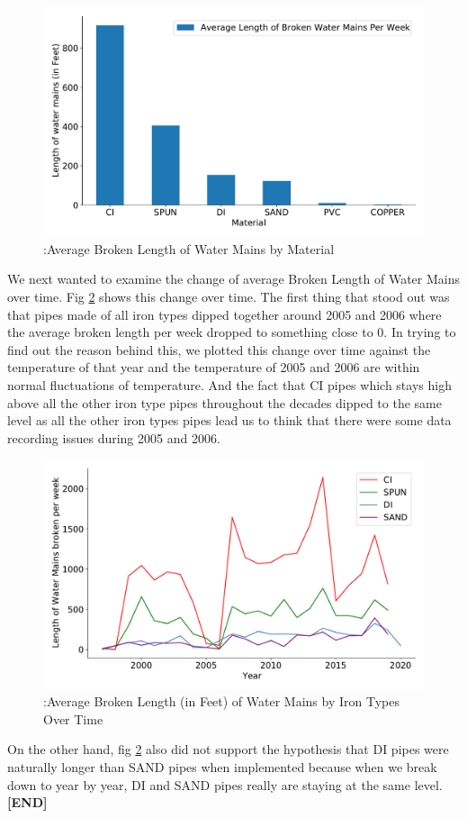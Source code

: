\documentclass[twocolumn]{article}
\begin{document}
\begin{figure}[H]
    \includegraphics[width=\columnwidth]{Wen/Average Length of Broken Water Mains Per Week.pdf}
    \caption{:Average Broken Length of Water Mains by Material}
    \label{fig:Average Broken Length of Water Mains by Material}
\end{figure}
We next wanted to examine the change of average Broken Length of Water Mains over time. Fig \ref{fig:Average Broken Length of Water Mains by Iron Types over time} shows this change over time. The first thing that stood out was that pipes made of all iron types dipped together around 2005 and 2006 where the average broken length per week dropped to something close to 0. In trying to find out the reason behind this, we plotted this change over time against the temperature of that year and the temperature of 2005 and 2006 are within normal fluctuations of temperature. And the fact that CI pipes which stays high above all the other iron type pipes throughout the decades dipped to the same level as all the other iron types pipes lead us to think that there were some data recording issues during 2005 and 2006. 
\begin{figure}[H]
    \includegraphics[width=\columnwidth]{Wen/ave broken len per week.pdf}
    \caption{:Average Broken Length (in Feet) of Water Mains by Iron Types Over Time}
    \label{fig:Average Broken Length of Water Mains by Iron Types over time}
\end{figure}
On the other hand, fig \ref{fig:Average Broken Length of Water Mains by Iron Types over time} also did not support the hypothesis that DI pipes were naturally longer than SAND pipes when implemented because when we break down to year by year, DI and SAND pipes really are staying at the same level. 
\textbf{[END]} 
\end{document}
